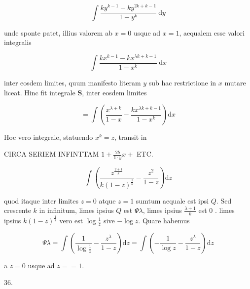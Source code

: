 \documentclass[10pt]{article}
\begin{document}
\[
\int \frac{k y^{k-1}-k y^{2 k+k-1}}{1-y^{k}} \mathrm{~d} y
\]

unde sponte patet, illius valorem ab \(x=0\) usque ad \(x=1\), aequalem esse valori integralis

\[
\int \frac{k x^{k-1}-k x^{\lambda k+k-1}}{1-x^{k}} \mathrm{~d} x
\]

inter eosdem limites, quum manifesto literam \(y\) sub hac restrictione in \(x\) mutare liceat. Hinc fit integrale \(\boldsymbol{S}\), inter eosdem limites

\[
=\int\left(\frac{x^{\lambda+k}}{1-x}-\frac{k x^{\lambda k+k-1}}{1-x^{k}}\right) \mathrm{d} x
\]

Hoc vero integrale, statuendo \(x^{k}=z\), transit in

CIRCA SERIEM INFINTTAM \(1+\frac{2 b}{1 \cdot y} x+\) ETC.

\[
\int\left(\frac{z^{\frac{2+1}{k}}}{k(1-z)^{\frac{1}{k}}}-\frac{z^{2}}{1-z}\right) \mathrm{d} z
\]

quod itaque inter limites \(z=0\) atque \(z=1\) sumtum aequale est ipsi \(Q\). Sed crescente \(k\) in infinitum, limes ipsius \(Q\) est \(\Psi \lambda\), limes ipsius \(\frac{\lambda+1}{k}\) est 0 . limes ipsius \(k(1-z)^{\frac{1}{k}}\) vero est \(\log \frac{1}{z}\) sive \(-\log z\). Quare habemus

\[
\Psi \lambda=\int\left(\frac{1}{\log \frac{1}{z}}-\frac{z^{\lambda}}{1-z}\right) \mathrm{d} z=\int\left(-\frac{1}{\log z}-\frac{z^{\lambda}}{1-z}\right) \mathrm{d} z
\]

a \(z=0\) usque ad \(z==1\).

36.
\end{document}
